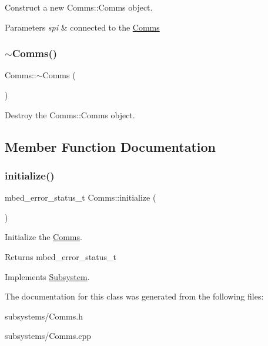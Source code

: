 Construct a new Comms\+::\+Comms object. 


\begin{DoxyParams}{Parameters}
{\em spi} & connected to the \mbox{\hyperlink{class_comms}{Comms}} \\
\hline
\end{DoxyParams}
\mbox{\label{class_comms_ad18d3a80a82d18d27b0de3b551e4f5fc}} 
\subsubsection{\texorpdfstring{$\sim$Comms()}{~Comms()}}
{\footnotesize\ttfamily Comms\+::$\sim$\+Comms (\begin{DoxyParamCaption}{ }\end{DoxyParamCaption})}



Destroy the Comms\+::\+Comms object. 



\subsection{Member Function Documentation}
\mbox{\label{class_comms_adf638922e6c53bef0fab4f482775f072}} 
\subsubsection{\texorpdfstring{initialize()}{initialize()}}
{\footnotesize\ttfamily mbed\+\_\+error\+\_\+status\+\_\+t Comms\+::initialize (\begin{DoxyParamCaption}{ }\end{DoxyParamCaption})\hspace{0.3cm}{\ttfamily [virtual]}}



Initialize the \mbox{\hyperlink{class_comms}{Comms}}. 

\begin{DoxyReturn}{Returns}
mbed\+\_\+error\+\_\+status\+\_\+t 
\end{DoxyReturn}


Implements \mbox{\hyperlink{class_subsystem_afa43e7c1c8b49e514b944f517d4dc905}{Subsystem}}.



The documentation for this class was generated from the following files\+:\begin{DoxyCompactItemize}
\item 
subsystems/Comms.\+h\item 
subsystems/Comms.\+cpp\end{DoxyCompactItemize}
